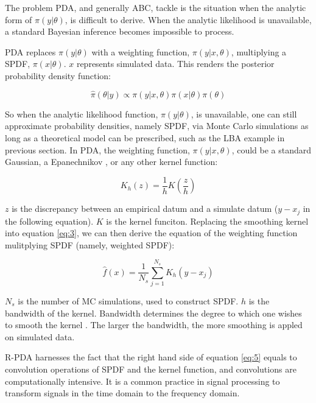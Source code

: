 \documentclass[shortnames,nojss,article]{jss}
\begin{document}
The problem PDA, and generally ABC, tackle is the situation when the analytic
form of $\pi(y|\theta)$, is difficult to derive.  When the analytic
likelihood is unavailable, a standard Bayesian inference becomes impossible to
process.

PDA replaces $\pi(y|\theta)$ with a weighting function, $\pi(y|x, \theta)$,
multiplying a SPDF, $\pi(x|\theta)$. $x$ represents simulated data. This
renders the posterior probability density function:

\begin{equation} \label{eq:3}
\hat{\pi}(\theta|y) \propto \pi(y|x,\theta)\pi(x|\theta) \pi(\theta)
\end{equation}

So when the analytic likelihood function, $\pi(y|\theta)$, is
unavailable, one can still approximate probability densities, namely SPDF, via
Monte Carlo simulations as long as a theoretical model can be prescribed,
such as the LBA example in previous section.  In PDA, the weighting
function, $\pi(y|x, \theta)$, could be a standard Gaussian, a
Epanechnikov  \citep{holmes_practical_2015,turner_generalized_2014}, or
any other kernel function:

\begin{equation} \label{eq:4}
K_h(z) = \frac{1}{h}K(\frac{z}{h})
\end{equation}

$z$ is the discrepancy between an empirical datum and a simulate datum
($y-x_j$ in the following equation). $K$ is the kernel funciton. Replacing the
smoothing kernel into equation \ref{eq:3}, we can then derive
the equation of the weighting function mulitplying SPDF (namely, weighted SPDF): 

\begin{equation} \label{eq:5}
\hat{f}(x) = \frac{1}{N_s} \sum^{N_s}_{j=1} K_h (y-x_j)
\end{equation}

$N_s$ is the number of MC simulations, used to construct SPDF. $h$ is the
bandwidth of the kernel. Bandwidth determines the degree to which one wishes 
to smooth the kernel \citep{silverman_density_1986}. The larger the bandwidth, 
the more smoothing is appled on simulated data.

R-PDA harnesses the fact that the right hand side of equation \ref{eq:5}
equals to convolution operations of SPDF and the kernel function, and
convolutions are computationally intensive.  It is a common practice
in signal processing to transform signals in the time domain to the frequency
domain.
\end{document}
